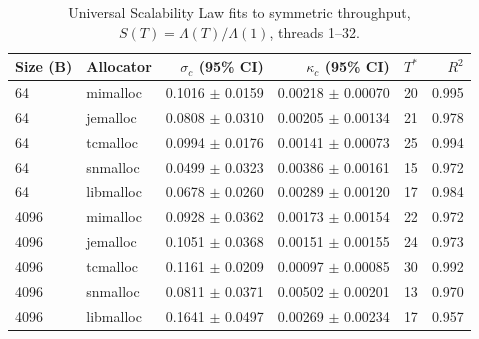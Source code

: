 \begin{table}[!htbp]
\centering
\footnotesize
\setlength{\tabcolsep}{3pt}
\caption{Universal Scalability Law fits to symmetric throughput, $S(T)=\Lambda(T)/\Lambda(1)$, threads 1--32.}
\label{tab:usl}
\begin{tabular}{llrrrr}
\toprule
Size (B) & Allocator & $\sigma_c$ (95\% CI) & $\kappa_c$ (95\% CI) & $T^*$ & $R^2$\\
\midrule
64 & mimalloc & 0.1016 $\pm$ 0.0159 & 0.00218 $\pm$ 0.00070 & 20 & 0.995 \\
64 & jemalloc & 0.0808 $\pm$ 0.0310 & 0.00205 $\pm$ 0.00134 & 21 & 0.978 \\
64 & tcmalloc & 0.0994 $\pm$ 0.0176 & 0.00141 $\pm$ 0.00073 & 25 & 0.994 \\
64 & snmalloc & 0.0499 $\pm$ 0.0323 & 0.00386 $\pm$ 0.00161 & 15 & 0.972 \\
64 & libmalloc & 0.0678 $\pm$ 0.0260 & 0.00289 $\pm$ 0.00120 & 17 & 0.984 \\
4096 & mimalloc & 0.0928 $\pm$ 0.0362 & 0.00173 $\pm$ 0.00154 & 22 & 0.972 \\
4096 & jemalloc & 0.1051 $\pm$ 0.0368 & 0.00151 $\pm$ 0.00155 & 24 & 0.973 \\
4096 & tcmalloc & 0.1161 $\pm$ 0.0209 & 0.00097 $\pm$ 0.00085 & 30 & 0.992 \\
4096 & snmalloc & 0.0811 $\pm$ 0.0371 & 0.00502 $\pm$ 0.00201 & 13 & 0.970 \\
4096 & libmalloc & 0.1641 $\pm$ 0.0497 & 0.00269 $\pm$ 0.00234 & 17 & 0.957 \\
\bottomrule
\end{tabular}
\end{table}
